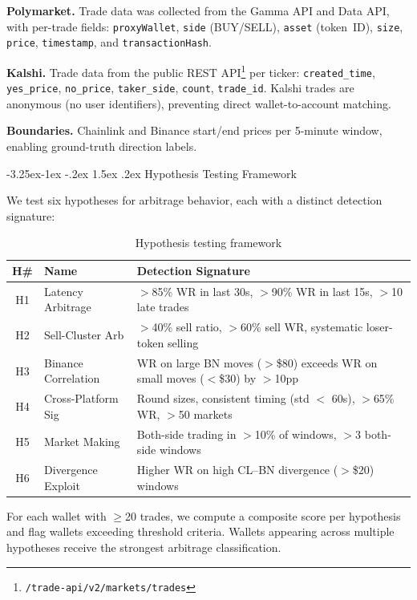 \documentclass[11pt,a4paper]{article}
\makeatletter
\renewcommand\subsection{\@startsection{subsection}{2}{\z@}%
  {-3.25ex\@plus -1ex \@minus -.2ex}%
  {1.5ex \@plus .2ex}%
  {\normalfont\large\bfseries}}
\makeatother
\begin{document}
\textbf{Polymarket.} Trade data was collected from the Gamma API and Data API, with per-trade fields: \texttt{proxyWallet}, \texttt{side} (BUY/\allowbreak{}SELL), \texttt{asset} (token~ID), \texttt{size}, \texttt{price}, \texttt{timestamp}, and \texttt{transactionHash}.

\textbf{Kalshi.} Trade data from the public REST API\footnote{\texttt{/trade-api/v2/\allowbreak{}markets/trades}} per ticker: \texttt{created\_time}, \texttt{yes\_price}, \texttt{no\_price}, \texttt{taker\_side}, \texttt{count}, \texttt{trade\_id}. Kalshi trades are anonymous (no user identifiers), preventing direct wallet-to-account matching.

\textbf{Boundaries.} Chainlink and Binance start/end prices per 5-minute window, enabling ground-truth direction labels.

\clearpage
\subsection{Hypothesis Testing Framework}

We test six hypotheses for arbitrage behavior, each with a distinct detection signature:

\begin{table}[H]
\centering
\caption{Hypothesis testing framework}
\label{tab:hypotheses}
\small
\begin{tabular}{@{}clp{7.5cm}@{}}
\toprule
\textbf{H\#} & \textbf{Name} & \textbf{Detection Signature} \\
\midrule
H1 & Latency Arbitrage & $>$85\% WR in last 30s, $>$90\% WR in last 15s, $>$10 late trades \\
H2 & Sell-Cluster Arb & $>$40\% sell ratio, $>$60\% sell WR, systematic loser-token selling \\
H3 & Binance Correlation & WR on large BN moves ($>$\$80) exceeds WR on small moves ($<$\$30) by $>$10pp \\
H4 & Cross-Platform Sig & Round sizes, consistent timing (std $<$ 60s), $>$65\% WR, $>$50 markets \\
H5 & Market Making & Both-side trading in $>$10\% of windows, $>$3 both-side windows \\
H6 & Divergence Exploit & Higher WR on high CL--BN divergence ($>$\$20) windows \\
\bottomrule
\end{tabular}
\end{table}

For each wallet with $\geq$20 trades, we compute a composite score per hypothesis and flag wallets exceeding threshold criteria. Wallets appearing across multiple hypotheses receive the strongest arbitrage classification.
\end{document}
